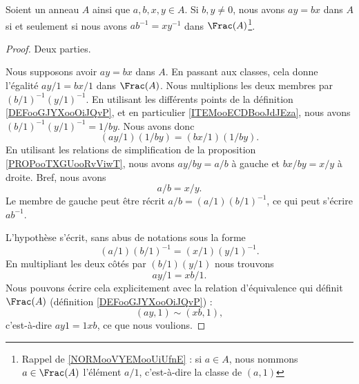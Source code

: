 \begin{lemma}       \label{LEMooBJRCooIZnaid}
	Soient un anneau \( A\) ainsi que \( a,b,x,y\in A\). Si \( b,y\neq 0\), nous avons \( ay=bx\) dans \( A\) si et seulement si nous avons \( ab^{-1}=xy^{-1}\) dans \( \Frac(A)\)\footnote{Rappel de \ref{NORMooVYEMooUiUfnE} : si \( a\in A\), nous nommons \( a\in \Frac(A)\) l'élément \( a/1\), c'est-à-dire la classe de \( (a,1)\)}.
\end{lemma}

\begin{proof}
	Deux parties.
	\begin{subproof}
		\spitem[\( \Rightarrow\)]
		Nous supposons avoir \( ay=bx\) dans \( A\). En passant aux classes, cela donne l'égalité \( ay/1=bx/1\) dans \( \Frac(A)\). Nous multiplions les deux membres par \( (b/1)^{-1}(y/1)^{-1}\). En utilisant les différents points de la définition \ref{DEFooGJYXooOiJQvP}, et en particulier \ref{ITEMooECDBooJdJEza}, nous avons\( (b/1)^{-1}(y/1)^{-1}=1/by\). Nous avons donc
		\begin{equation}
			(ay/1)(1/by)=(bx/1)(1/by).
		\end{equation}
		En utilisant les relations de simplification de la proposition \ref{PROPooTXGUooRvViwT}, nous avons \( ay/by=a/b\) à gauche et \( bx/by=x/y\) à droite. Bref, nous avons
		\begin{equation}
			a/b=x/y.
		\end{equation}
		Le membre de gauche peut être récrit \( a/b=(a/1)(b/1)^{-1}\), ce qui peut s'écrire \( ab^{-1}\).
	\end{subproof}

	\spitem[\( \Leftarrow\)]
	L'hypothèse s'écrit, sans abus de notations sous la forme
	\begin{equation}
		(a/1)(b/1)^{-1}=(x/1)(y/1)^{-1}.
	\end{equation}
	En multipliant les deux côtés par \( (b/1)(y/1)\) nous trouvons
	\begin{equation}
		ay/1=xb/1.
	\end{equation}
	Nous pouvons écrire cela explicitement avec la relation d'équivalence qui définit \( \Frac(A)\) (définition \ref{DEFooGJYXooOiJQvP}) :
	\begin{equation}
		(ay,1)\sim (xb,1),
	\end{equation}
	c'est-à-dire \( ay1=1xb\), ce que nous voulions.
\end{proof}

